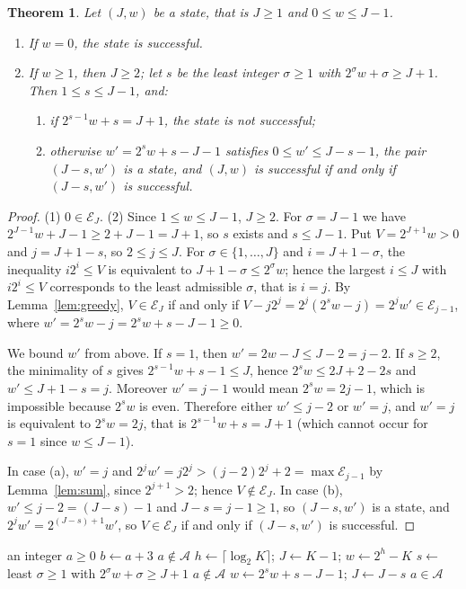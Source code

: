 \documentclass[11pt]{amsart}
\newtheorem{Theorem}{Theorem}[section]
\theoremstyle{definition}
\begin{document}
\begin{Theorem}
\label{thm:step}
Let $(J,w)$ be a state, that is $J\ge1$ and $0\le w\le J-1$.
\begin{enumerate}
\item If $w=0$, the state is successful.
\item If $w\ge1$, then $J\ge2$; let $s$ be the least integer $\sigma\ge1$ with $2^\sigma w+\sigma\ge J+1$. Then $1\le s\le J-1$, and:
\begin{enumerate}
\item if $2^{s-1}w+s=J+1$, the state is not successful;
\item otherwise $w'=2^sw+s-J-1$ satisfies $0\le w'\le J-s-1$, the pair $(J-s,w')$ is a state, and $(J,w)$ is successful if and only if $(J-s,w')$ is successful.
\end{enumerate}
\end{enumerate}
\end{Theorem}
\begin{proof}
(1) $0\in\mathcal{E}_J$. (2) Since $1\le w\le J-1$, $J\ge2$. For $\sigma=J-1$ we have $2^{J-1}w+J-1\ge2+J-1=J+1$, so $s$ exists and $s\le J-1$. Put $V=2^{J+1}w>0$ and $j=J+1-s$, so $2\le j\le J$. For $\sigma\in\{1,\dots,J\}$ and $i=J+1-\sigma$, the inequality $i2^i\le V$ is equivalent to $J+1-\sigma\le2^\sigma w$; hence the largest $i\le J$ with $i2^i\le V$ corresponds to the least admissible $\sigma$, that is $i=j$. By Lemma~\ref{lem:greedy}, $V\in\mathcal{E}_J$ if and only if $V-j2^j=2^j(2^sw-j)=2^jw'\in\mathcal{E}_{j-1}$, where $w'=2^sw-j=2^sw+s-J-1\ge0$.

We bound $w'$ from above. If $s=1$, then $w'=2w-J\le J-2=j-2$. If $s\ge2$, the minimality of $s$ gives $2^{s-1}w+s-1\le J$, hence $2^sw\le2J+2-2s$ and $w'\le J+1-s=j$. Moreover $w'=j-1$ would mean $2^sw=2j-1$, which is impossible because $2^sw$ is even. Therefore either $w'\le j-2$ or $w'=j$, and $w'=j$ is equivalent to $2^sw=2j$, that is $2^{s-1}w+s=J+1$ (which cannot occur for $s=1$ since $w\le J-1$).

In case (a), $w'=j$ and $2^jw'=j2^j>(j-2)2^j+2=\max\mathcal{E}_{j-1}$ by Lemma~\ref{lem:sum}, since $2^{j+1}>2$; hence $V\notin\mathcal{E}_J$. In case (b), $w'\le j-2=(J-s)-1$ and $J-s=j-1\ge1$, so $(J-s,w')$ is a state, and $2^jw'=2^{(J-s)+1}w'$, so $V\in\mathcal{E}_J$ if and only if $(J-s,w')$ is successful.
\end{proof}

\begin{algorithm}[H]
\caption{Membership of $a$ in $\mathcal{A}$}
\label{alg:membership}
\begin{algorithmic}[1]
\Require an integer $a\ge0$
\State $b\gets a+3$
\State \Return $a\notin\mathcal{A}$
\EndIf
\State $h\gets\lceil\log_2K\rceil$; $J\gets K-1$; $w\gets2^h-K$
\State $s\gets$ least $\sigma\ge1$ with $2^\sigma w+\sigma\ge J+1$
\State \Return $a\notin\mathcal{A}$
\EndIf
\State $w\gets2^sw+s-J-1$; $J\gets J-s$
\EndWhile
\State \Return $a\in\mathcal{A}$
\end{algorithmic}
\end{algorithm}
\end{document}
